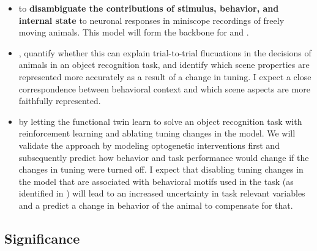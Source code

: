 \documentclass[B2,COG]{ercgrant}
\begin{document}
\begin{itemize}[leftmargin=2em,topsep=0pt,itemsep=0.62ex,partopsep=0ex,parsep=0.5ex,rightmargin=1ex]
    \item[\obj{1}] \textbf{\oonetitle} to \textbf{disambiguate the contributions of stimulus, behavior, and internal state} to neuronal responses in miniscope recordings of freely moving animals. This model will form the backbone for  and . 
    \item[\obj{2}] \textbf{\otwotitle}, quantify whether this can explain trial-to-trial flucuations in the decisions of animals in an object recognition task, and identify which scene properties are represented more accurately as a result of a change in tuning. 
    I expect a close correspondence between behavioral context and which scene aspects are more faithfully represented. 
    \item[\obj{3}] \textbf{\othreetitle} by letting the functional twin learn to solve an object recognition task with reinforcement learning and ablating tuning changes in the model. 
    We will validate the approach by modeling optogenetic interventions first and subsequently predict how behavior and task performance would change if the changes in tuning were turned off. 
    I expect that disabling tuning changes in the model that are associated with behavioral motifs used in the task (as identified in ) will lead to an increased uncertainty in task relevant variables and a predict a change in behavior of the animal to compensate for that. 
\end{itemize}

\subsection{Significance}
\end{document}
